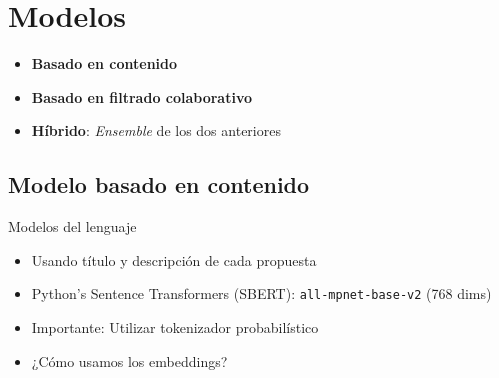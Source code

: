 \section{Modelos}
\begin{frame}
\begin{itemize}
    \item<1-> \textbf{Basado en contenido}
    \item<2-> \textbf{Basado en filtrado colaborativo}
    \item<4-> \textbf{Híbrido}: \textit{Ensemble} de los dos anteriores
\end{itemize}
\end{frame}

\subsection{Modelo basado en contenido}

\begin{frame}{Modelos del lenguaje}
    \begin{itemize}[<+->]
        \item Usando título y descripción de cada propuesta
        \item Python's Sentence Transformers (SBERT): \texttt{all-mpnet-base-v2} (768 dims)
        \item Importante: Utilizar tokenizador probabilístico
        \vspace*{4mm}
        \item ¿Cómo usamos los embeddings?
    \end{itemize}
\end{frame}

